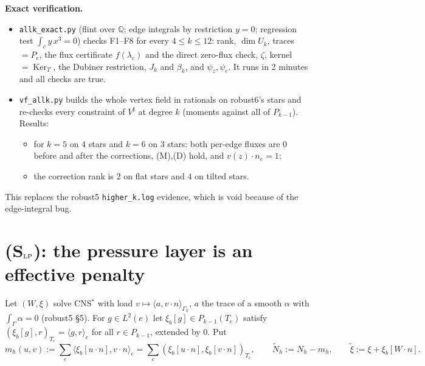 \documentclass[11pt]{article}
\theoremstyle{remark}
\newcommand{\Gh}{\Gamma_h}
\newcommand{\ip}[2]{\langle #1,#2\rangle}
\begin{document}
\noindent\textbf{Exact verification.}
\begin{itemize}
\item \texttt{allk\_exact.py} (flint over $\mathbb Q$; edge integrals by restriction $y=0$; regression test $\int_ey\,x^3=0$) checks F1--F8 for every
$4\le k\le12$: rank, $\dim U_k$, traces $=P_e$, the flux certificate $f(\lambda_c)$ and the direct zero-flux check, $\zeta$,
kernel $=\operatorname{Ker}_T$, the Dubiner restriction, $J_k$ and $\beta_k$, and $\psi_z,\psi_c$. It runs in 2 minutes and all checks are true.
\item \texttt{vf\_allk.py} builds the whole vertex field in rationals on robust6's stars and re-checks every constraint of $V^\sharp$ at degree $k$
(moments against all of $P_{k-1}$). Results:
 \begin{itemize}
 \item for $k=5$ on 4 stars and $k=6$ on 3 stars: both per-edge fluxes are $0$ before and after the corrections, (M),(D) hold, and $v(z)\cdot n_e=1$;
 \item the correction rank is $2$ on flat stars and $4$ on tilted stars.
 \end{itemize}
\end{itemize}
This replaces the robust5 \texttt{higher\_k.log} evidence, which is void because of the edge-integral bug.

\section{(S$_{\rm LP}$): the pressure layer is an effective penalty}
Let $(W,\xi)$ solve CNS$^\ast$ with load $v\mapsto\ip a{v\cdot n}_{\Gh}$, $a$ the trace of a smooth $\alpha$ with $\int_\Gamma\alpha=0$ (robust5 \S5).
For $g\in L^2(e)$ let $\xi_b[g]\in P_{k-1}(T_e)$ satisfy $(\xi_b[g],r)_{T_e}=\ip gr_e$ for all $r\in P_{k-1}$, extended by $0$. Put
\[
m_h(u,v):=\sum_{e}\ip{\xi_b[u\cdot n]}{v\cdot n}_e=\sum_e(\xi_b[u\cdot n],\xi_b[v\cdot n])_{T_e},\qquad \tilde N_h:=N_h-m_h,\qquad \tilde\xi:=\xi+\xi_b[W\cdot n].
\]
\end{document}
